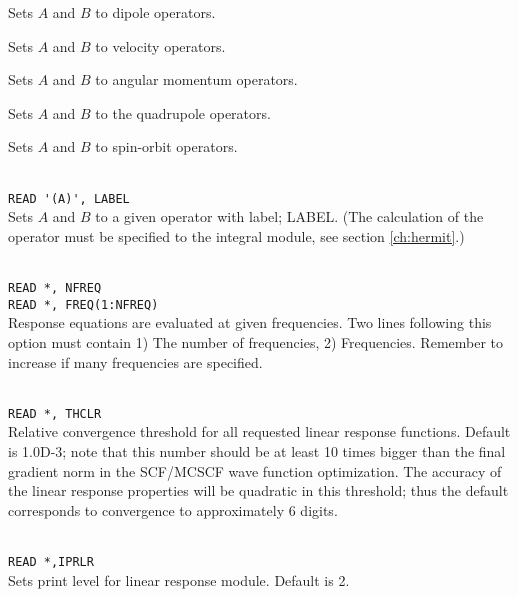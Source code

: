 \begin{description}

\item{}
Sets $A$ and $B$ to dipole operators.

\item{}
Sets $A$ and $B$ to velocity operators.

\item{}
Sets $A$ and $B$ to angular momentum operators.

\item{}
Sets $A$ and $B$ to the quadrupole operators.

\item{}
Sets $A$ and $B$ to spin-orbit operators.

\item{}\\
\verb|READ '(A)', LABEL|\\
Sets $A$ and $B$ to a given operator with label; LABEL.
(The calculation of the operator must be specified to the integral
module, see section \ref{ch:hermit}.)

\item{}\\
\verb|READ *, NFREQ|\\
\verb|READ *, FREQ(1:NFREQ)|\\
Response equations are evaluated at given
frequencies. Two lines following 
this option must contain 1) The number of frequencies, 2) Frequencies.
Remember to increase  if many frequencies are specified.

\item{}\\
\verb|READ *, THCLR|\\
Relative convergence threshold for all requested linear response functions.
Default is 1.0D-3; note that this number should be at least 10 times
bigger than the final gradient norm in the SCF/MCSCF
wave function optimization. The accuracy of the linear response 
properties will be quadratic in this threshold; thus the default
corresponds to convergence to approximately 6 digits.

\item{}\\
\verb|READ *,IPRLR|\\
Sets print level for linear response module. Default is 2.
 

\end{description}
